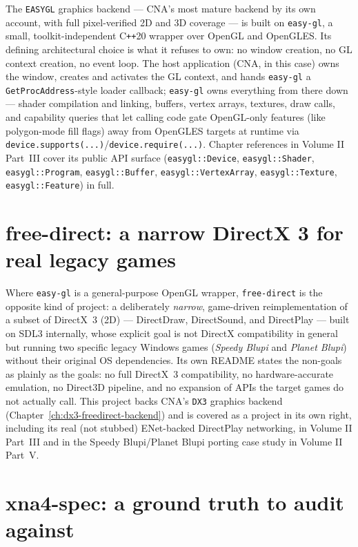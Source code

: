 The \texttt{EASYGL} graphics backend --- CNA's most mature backend by its own account, with
full pixel-verified 2D and 3D coverage --- is built on \texttt{easy-gl}, a small,
toolkit-independent C\texttt{++}20 wrapper over OpenGL and OpenGLES. Its defining
architectural choice is what it refuses to own: no window creation, no GL context creation,
no event loop. The host application (CNA, in this case) owns the window, creates and
activates the GL context, and hands \texttt{easy-gl} a \texttt{GetProcAddress}-style loader
callback; \texttt{easy-gl} owns everything from there down --- shader compilation and
linking, buffers, vertex arrays, textures, draw calls, and capability queries that let calling
code gate OpenGL-only features (like polygon-mode fill flags) away from OpenGLES targets at
runtime via \texttt{device.supports(...)}/\texttt{device.require(...)}. Chapter references in
Volume II Part~III cover its public API surface (\texttt{easygl::Device},
\texttt{easygl::Shader}, \texttt{easygl::Program}, \texttt{easygl::Buffer},
\texttt{easygl::VertexArray}, \texttt{easygl::Texture}, \texttt{easygl::Feature}) in full.

\section{free-direct: a narrow DirectX 3 for real legacy games}

Where \texttt{easy-gl} is a general-purpose OpenGL wrapper, \texttt{free-direct} is the
opposite kind of project: a deliberately \emph{narrow}, game-driven reimplementation of a
subset of DirectX~3 (2D) --- DirectDraw, DirectSound, and DirectPlay --- built on SDL3
internally, whose explicit goal is not DirectX compatibility in general but running two
specific legacy Windows games (\emph{Speedy Blupi} and \emph{Planet Blupi}) without their
original OS dependencies. Its own README states the non-goals as plainly as the goals: no
full DirectX~3 compatibility, no hardware-accurate emulation, no Direct3D pipeline, and no
expansion of APIs the target games do not actually call. This project backs CNA's
\texttt{DX3} graphics backend (Chapter~\ref{ch:dx3-freedirect-backend}) and is covered as a
project in its own right, including its real (not stubbed) ENet-backed DirectPlay networking,
in Volume II Part~III and in the Speedy Blupi/Planet Blupi porting case study in Volume II
Part~V.

\section{xna4-spec: a ground truth to audit against}


